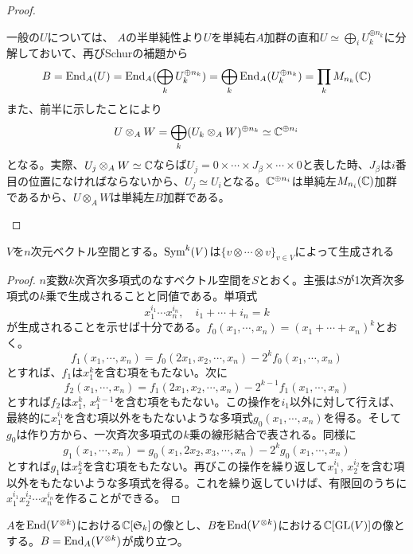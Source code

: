 \documentclass{ltjsreport}
\begin{document}
\begin{proof}
\begin{enumerate}
      一般の$U$については、
      $A$の半単純性より$U$を単純右$A$加群の直和$U\simeq\bigoplus_iU_k^{\oplus n_k}$に分解しておいて、再びSchurの補題から
      \[
      B=\text{End}_A(U)=\text{End}_A(\bigoplus_kU_k^{\oplus n_k})=\bigoplus_k\text{End}_A(U_k^{\oplus n_k})=\prod_kM_{n_k}(\mathbb{C})
      \]
      また、前半に示したことにより
      \[
      U\otimes_AW=\bigoplus_k(U_k\otimes_AW)^{\oplus n_k}\simeq \mathbb{C}^{\oplus n_i}
      \]
      となる。実際、$U_j\otimes_AW\simeq \mathbb{C}$ならば$U_j=0\times\cdots\times J_\beta\times\cdots\times 0$と表した時、$J_\beta$は$i$番目の位置になければならないから、$U_j\simeq U_i$となる。$\mathbb{C}^{\oplus n_i}$は単純左$M_{n_i}(\mathbb{C})$加群であるから、$U\otimes_AW$は単純左$B$加群である。
  \end{enumerate}
\end{proof}


\begin{lemm}\label{gen_of_symtensor}
  $V$を$n$次元ベクトル空間とする。$\text{Sym}^k(V)$は$\{v\otimes\cdots\otimes v\}_{v\in V}$によって生成される
\end{lemm}

\begin{proof}
  $n$変数$k$次斉次多項式のなすベクトル空間を$S$とおく。主張は$S$が1次斉次多項式の$k$乗で生成されることと同値である。単項式
  \[
  x_1^{i_1}\cdots x_n^{i_n},\quad i_1+\cdots+i_n=k
  \]
  が生成されることを示せば十分である。$f_0(x_1,\cdots,x_n)=(x_1+\cdots +x_n)^k$とおく。
  \[
  f_1(x_1,\cdots,x_n)=f_0(2x_1,x_2,\cdots,x_n)-2^{k}f_0(x_1,\cdots,x_n)  
  \]
  とすれば、$f_1$は$x_1^k$を含む項をもたない。次に
  \[
  f_2(x_1,\cdots,x_n)=f_1(2x_1,x_2,\cdots,x_n)-2^{k-1}f_1(x_1,\cdots,x_n)  
  \]
  とすれば$f_2$は$x_1^{k}$, $x_1^{k-1}$を含む項をもたない。この操作を$i_1$以外に対して行えば、最終的に$x_1^{i_1}$を含む項以外をもたないような多項式$g_0(x_1,\cdots,x_n)$を得る。そして$g_0$は作り方から、一次斉次多項式の$k$乗の線形結合で表される。同様に
  \[
  g_1(x_1,\cdots,x_n)=g_0(x_1,2x_2,x_3,\cdots,x_n)-2^{k}g_0(x_1,\cdots,x_n)  
  \]
  とすれば$g_1$は$x_2^k$を含む項をもたない。再びこの操作を繰り返して$x_1^{i_1}$, $x_2^{i_2}$を含む項以外をもたないような多項式を得る。これを繰り返していけば、有限回のうちに$x_1^{i_1}x_2^{i_2}\cdots x_n^{i_n}$を作ることができる。
\end{proof}


\begin{lemm}\label{lemma}
  $A$を$\text{End}(V^{\otimes k})$における$\mathbb{C}[\mathfrak{S}_k]$の像とし、$B$を$\text{End}(V^{\otimes k})$における$\mathbb{C}[\text{GL}(V)]$の像とする。$B=\text{End}_A(V^{\otimes k})$が成り立つ。
\end{lemm}
\end{document}
